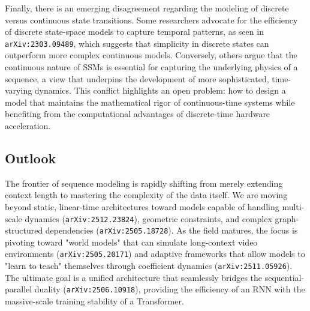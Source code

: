 \documentclass[11pt]{article}
\begin{document}
Finally, there is an emerging disagreement regarding the modeling of discrete versus continuous state transitions. Some researchers advocate for the efficiency of discrete state-space models to capture temporal patterns, as seen in \texttt{arXiv:2303.09489}, which suggests that simplicity in discrete states can outperform more complex continuous models. Conversely, others argue that the continuous nature of SSMs is essential for capturing the underlying physics of a sequence, a view that underpins the development of more sophisticated, time-varying dynamics. This conflict highlights an open problem: how to design a model that maintains the mathematical rigor of continuous-time systems while benefiting from the computational advantages of discrete-time hardware acceleration.

\subsection{Outlook}

The frontier of sequence modeling is rapidly shifting from merely extending context length to mastering the complexity of the data itself. We are moving beyond static, linear-time architectures toward models capable of handling multi-scale dynamics (\texttt{arXiv:2512.23824}), geometric constraints, and complex graph-structured dependencies (\texttt{arXiv:2505.18728}). As the field matures, the focus is pivoting toward "world models" that can simulate long-context video environments (\texttt{arXiv:2505.20171}) and adaptive frameworks that allow models to "learn to teach" themselves through coefficient dynamics (\texttt{arXiv:2511.05926}). The ultimate goal is a unified architecture that seamlessly bridges the sequential-parallel duality (\texttt{arXiv:2506.10918}), providing the efficiency of an RNN with the massive-scale training stability of a Transformer.
\end{document}
